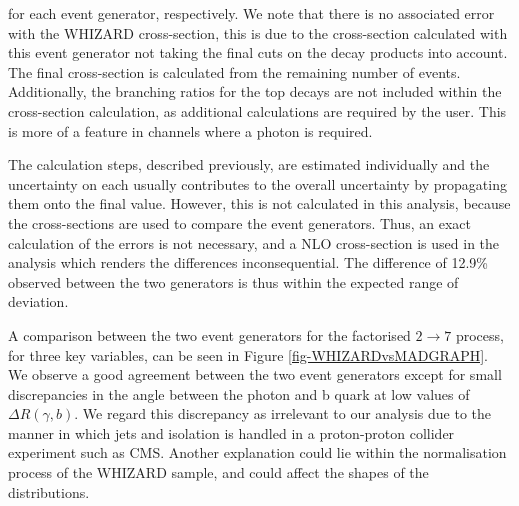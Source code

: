 for each event generator, respectively. We note that there is no associated error with the WHIZARD cross-section, this is due to the cross-section calculated with this event generator not taking the final cuts on the decay products into account. The final cross-section is calculated from the remaining number of events. Additionally, the branching ratios for the top decays are not included within the cross-section calculation, as additional calculations are required by the user. This is more of a feature in channels where a photon is required. 

The calculation steps, described previously, are estimated individually and the uncertainty on each usually contributes to the overall uncertainty by propagating them onto the final value. However, this is not calculated in this analysis, because the cross-sections are used to compare the event generators. Thus, an exact calculation of the errors is not necessary, and a NLO cross-section is used in the analysis which renders the differences inconsequential. The difference of 12.9\% observed between the two generators is thus within the expected range of deviation. 

A comparison between the two event generators for the factorised $2 \to 7$ process, for three key variables, can be seen in Figure \ref{fig-WHIZARDvsMADGRAPH}. We observe a good agreement between the two event generators except for small discrepancies in the angle between the photon and b quark at low values of $\Delta R (\gamma, b)$. We regard this discrepancy as irrelevant to our analysis due to the manner in which jets and isolation is handled in a proton-proton collider experiment such as CMS. Another explanation could lie within the normalisation process of the WHIZARD sample, and could affect the shapes of the distributions.

